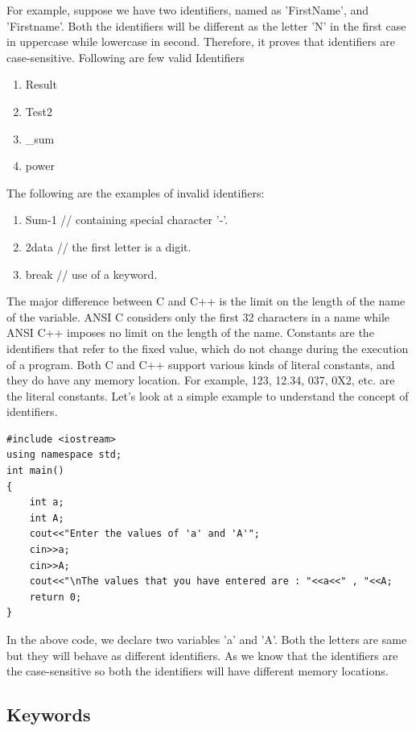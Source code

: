 \documentclass{book}
\begin{document}
For example, suppose we have two identifiers, named as 'FirstName', and 'Firstname'. Both the identifiers will be different as the letter 'N' in the first case in uppercase while lowercase in second. Therefore, it proves that identifiers are case-sensitive. Following are few valid Identifiers

\begin{enumerate}
	\item Result  
\item Test2  
\item \_sum  
\item power 
\end{enumerate}

The following are the examples of invalid identifiers:

\begin{enumerate}
	\item Sum-1   // containing special character '-'.  
\item 2data    // the first letter is a digit.   
\item break    // use of a keyword.    
\end{enumerate}

The major difference between C and C++ is the limit on the length of the name of the variable. ANSI C considers only the first 32 characters in a name while ANSI C++ imposes no limit on the length of the name. Constants are the identifiers that refer to the fixed value, which do not change during the execution of a program. Both C and C++ support various kinds of literal constants, and they do have any memory location. For example, 123, 12.34, 037, 0X2, etc. are the literal constants. Let's look at a simple example to understand the concept of identifiers.

\begin{lstlisting}
#include <iostream>  
using namespace std;  
int main()  
{  
	int a;  
	int A;  
	cout<<"Enter the values of 'a' and 'A'";  
	cin>>a;  
	cin>>A;  
	cout<<"\nThe values that you have entered are : "<<a<<" , "<<A;  
	return 0;  
}  
\end{lstlisting}

In the above code, we declare two variables 'a' and 'A'. Both the letters are same but they will behave as different identifiers. As we know that the identifiers are the case-sensitive so both the identifiers will have different memory locations.

\subsection{Keywords}
\end{document}
